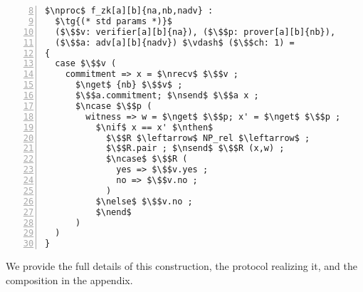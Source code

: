 \begin{lstlisting}[basicstyle=\footnotesize\BeraMonottFamily, mathescape, frame=single, numbers=left, xleftmargin=2em, xrightmargin=0.9em, firstnumber=8]
$\nproc$ f_zk[a][b]{na,nb,nadv} :
  $\tg{(* std params *)}$
  ($\$$v: verifier[a][b]{na}), ($\$$p: prover[a][b]{nb}),
  ($\$$a: adv[a][b]{nadv}) $\vdash$ ($\$$ch: 1) =
{
  case $\$$v (
    commitment => x = $\nrecv$ $\$$v ;
      $\nget$ {nb} $\$$v$ ;
      $\$$a.commitment; $\nsend$ $\$$a x ;
      $\ncase $\$$p (
        witness => w = $\nget$ $\$$p; x' = $\nget$ $\$$p ;
          $\nif$ x == x' $\nthen$
            $\$$R $\leftarrow$ NP_rel $\leftarrow$ ;
            $\$$R.pair ; $\nsend$ $\$$R (x,w) ;
            $\ncase$ $\$$R (
              yes => $\$$v.yes ;
              no => $\$$v.no ;
            )
          $\nelse$ $\$$v.no ;
		  $\nend$
	  )
  )
}
\end{lstlisting}
We provide the full details of this construction, the protocol realizing it, and the composition in the appendix. 


